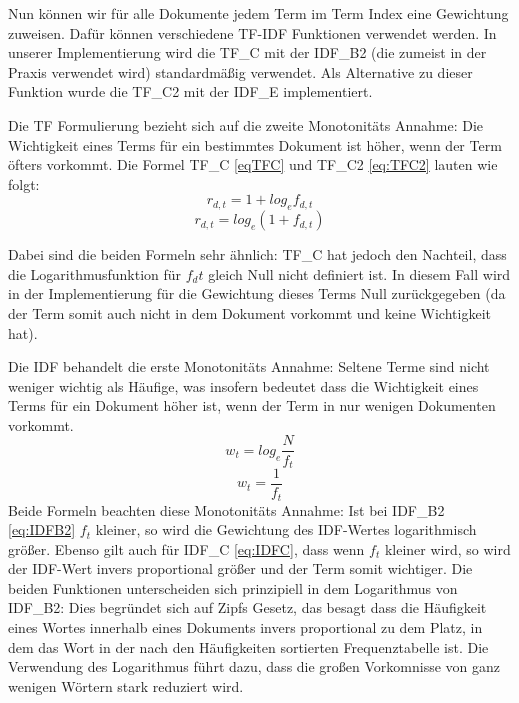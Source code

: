 \documentclass[prodmode,acmtecs]{acmsmall} %
\begin{document}
Nun können wir für alle Dokumente jedem Term im Term Index eine Gewichtung zuweisen. Dafür können verschiedene TF-IDF Funktionen verwendet werden. In unserer Implementierung wird die TF\_C mit der IDF\_B2 (die zumeist in der Praxis verwendet wird) standardmäßig verwendet. Als Alternative zu dieser Funktion wurde die TF\_C2 mit der IDF\_E implementiert. 

Die TF Formulierung bezieht sich auf die zweite Monotonitäts Annahme: Die Wichtigkeit eines Terms für ein bestimmtes Dokument ist höher, wenn der Term öfters vorkommt.
Die Formel TF\_C \eqref{eqTFC} und TF\_C2 \eqref{eq:TFC2} lauten wie folgt:
\begin{equation}\label{eqTFC}
  r_{d,t} = 1 + log_{e} f_{d,t}
\end{equation}
\begin{equation}\label{eq:TFC2}
  r_{d,t} = log_{e} (1 + f_{d,t})
\end{equation}

Dabei sind die beiden Formeln sehr ähnlich: TF\_C hat jedoch den Nachteil, dass die Logarithmusfunktion für $f_dt$ gleich Null nicht definiert ist. In diesem Fall wird in der Implementierung für die Gewichtung dieses Terms Null zurückgegeben (da der Term somit auch nicht in dem Dokument vorkommt und keine Wichtigkeit hat). 

Die IDF behandelt die erste Monotonitäts Annahme: Seltene Terme sind nicht weniger wichtig als Häufige, was insofern bedeutet dass die Wichtigkeit eines Terms für ein Dokument höher ist, wenn der Term in nur wenigen Dokumenten vorkommt.
\begin{equation}\label{eq:IDFB2}
  w_{t} = log_{e} \frac{N}{f_{t}}
\end{equation}
\begin{equation}\label{eq:IDFC}
  w_{t} = \frac{1}{f_{t}}
\end{equation}
Beide Formeln beachten diese Monotonitäts Annahme: Ist bei IDF\_B2 \eqref{eq:IDFB2} $f_t$ kleiner, so wird die Gewichtung des IDF-Wertes logarithmisch größer. Ebenso gilt auch für IDF\_C \eqref{eq:IDFC}, dass wenn $f_t$ kleiner wird, so wird der IDF-Wert invers proportional größer und der Term somit wichtiger. Die beiden Funktionen unterscheiden sich prinzipiell in dem Logarithmus von IDF\_B2: Dies begründet sich auf Zipfs Gesetz, das besagt dass die Häufigkeit eines Wortes innerhalb eines Dokuments invers proportional zu dem Platz, in dem das Wort in der nach den Häufigkeiten sortierten Frequenztabelle ist. Die Verwendung des Logarithmus führt dazu, dass die großen Vorkomnisse von ganz wenigen Wörtern stark reduziert wird.
\end{document}
